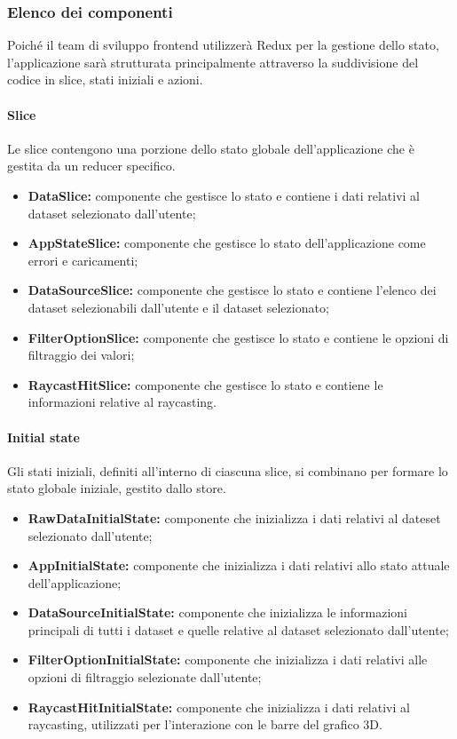\subsubsection{Elenco dei componenti}
Poiché il team di sviluppo frontend utilizzerà Redux per la gestione dello stato, l'applicazione sarà strutturata principalmente attraverso la suddivisione del codice in slice, stati iniziali e azioni.
\paragraph{Slice}
    Le slice contengono una porzione dello stato globale dell’applicazione che è gestita da un reducer
    specifico.
\begin{itemize}
        \item \textbf{DataSlice:} componente che gestisce lo stato e contiene i dati relativi al dataset selezionato dall'utente;
        \item \textbf{AppStateSlice:} componente che gestisce lo stato dell'applicazione come errori e caricamenti;
        \item \textbf{DataSourceSlice:} componente che gestisce lo stato e contiene l'elenco dei dataset selezionabili dall'utente e il dataset selezionato;
        \item \textbf{FilterOptionSlice:} componente che gestisce lo stato e contiene le opzioni di filtraggio dei valori;
        \item \textbf{RaycastHitSlice:} componente che gestisce lo stato e contiene le informazioni relative al raycasting.
\end{itemize}
\paragraph{Initial state}
    Gli stati iniziali, definiti all'interno di ciascuna slice, si combinano per formare lo stato globale iniziale, gestito dallo store.
    \begin{itemize}
        \item \textbf{RawDataInitialState:} componente che inizializza i dati relativi al dateset selezionato dall'utente;
        \item \textbf{AppInitialState:} componente che inizializza i dati relativi allo stato attuale dell'applicazione;
        \item \textbf{DataSourceInitialState:} componente che inizializza le informazioni principali di tutti i dataset e quelle relative al dataset selezionato dall'utente;
        \item \textbf{FilterOptionInitialState:} componente che inizializza i dati relativi alle opzioni di filtraggio selezionate dall'utente;
        \item \textbf{RaycastHitInitialState:} componente che inizializza i dati relativi al raycasting, utilizzati per l'interazione con le barre del grafico 3D.
    \end{itemize}
